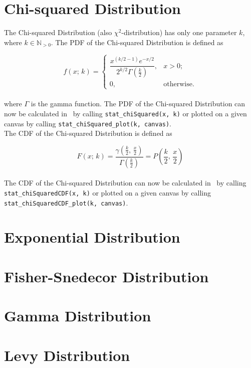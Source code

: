 	\section{Chi-squared Distribution}

		The Chi-squared Distribution (also $\chi^2$-distribution) has only one parameter $k$, where $k \in \mathbb{N}_{>0}$. The \ac{PDF} of the Chi-squared Distribution is defined as

		$$f(x;\,k) =
		\begin{cases}
			\dfrac{x^{(k/2-1)} e^{-x/2}}{2^{k/2} \Gamma\left(\frac k 2 \right)},  & x > 0; \\ 0, & \text{otherwise}.
		\end{cases}$$
		\\[0.3cm]
		where $\Gamma$ is the gamma function. The \ac{PDF} of the Chi-squared Distribution can now be calculated in \setlx\ by calling \lstinline{stat_chiSquared(x, k)} or plotted on a given canvas by calling \lstinline{stat_chiSquared_plot(k, canvas)}.
		\\[0.3cm]
		The \ac{CDF} of the Chi-squared Distribution is defined as

		$$F(x;\,k) = \frac{\gamma(\frac{k}{2},\,\frac{x}{2})}{\Gamma(\frac{k}{2})} = P\left(\frac{k}{2},\,\frac{x}{2}\right)$$
		\\[0.3cm]
		The \ac{CDF} of the Chi-squared Distribution can now be calculated in \setlx\ by calling \lstinline{stat_chiSquaredCDF(x, k)} or plotted on a given canvas by calling \lstinline{stat_chiSquaredCDF_plot(k, canvas)}.

	\section{Exponential Distribution}

	\section{Fisher-Snedecor Distribution}

	\section{Gamma Distribution}

	\section{Levy Distribution}
	
